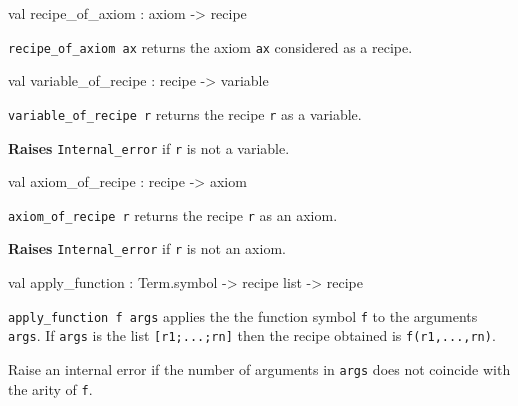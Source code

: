 \label{val:Recipe.recipe-underscoreof-underscoreaxiom}\begin{ocamldoccode}
val recipe_of_axiom : axiom -> recipe
\end{ocamldoccode}
\begin{ocamldocdescription}
{\tt{recipe\_of\_axiom ax}} returns the axiom {\tt{ax}} considered as a recipe.


\end{ocamldocdescription}




\label{val:Recipe.variable-underscoreof-underscorerecipe}\begin{ocamldoccode}
val variable_of_recipe : recipe -> variable
\end{ocamldoccode}
\begin{ocamldocdescription}
{\tt{variable\_of\_recipe r}} returns the recipe {\tt{r}} as a variable.

{\bf Raises} {\tt{Internal\_error}} if {\tt{r}} is not a variable.


\end{ocamldocdescription}




\label{val:Recipe.axiom-underscoreof-underscorerecipe}\begin{ocamldoccode}
val axiom_of_recipe : recipe -> axiom
\end{ocamldoccode}
\begin{ocamldocdescription}
{\tt{axiom\_of\_recipe r}} returns the recipe {\tt{r}} as an axiom.

{\bf Raises} {\tt{Internal\_error}} if {\tt{r}} is not an axiom.


\end{ocamldocdescription}




\label{val:Recipe.apply-underscorefunction}\begin{ocamldoccode}
val apply_function : Term.symbol -> recipe list -> recipe
\end{ocamldoccode}
\begin{ocamldocdescription}
{\tt{apply\_function f args}} applies the the function symbol {\tt{f}} to the arguments {\tt{args}}.
    If {\tt{args}} is the list {\tt{[r1;...;rn]}} then the recipe obtained is {\tt{f(r1,...,rn)}}.


    \lowdebug  Raise an internal error if the number of arguments in {\tt{args}} does not coincide
    with the arity of {\tt{f}}.


\end{ocamldocdescription}




